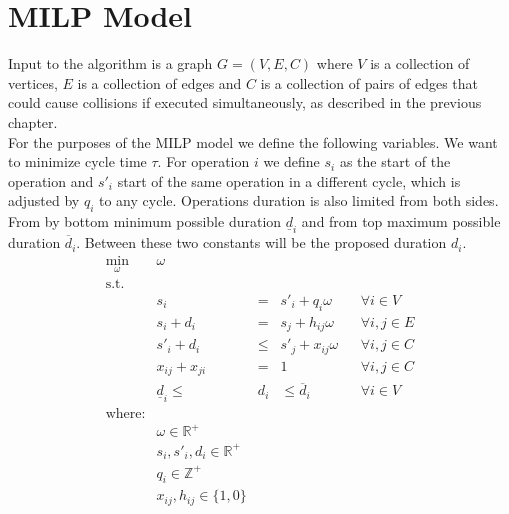 \chapter{MILP Model}
\label{ch:milp_model}
\graphicspath{{chapters/MILP_Model/}}

Input to the algorithm is a graph \(G=(V, E, C)\) where \(V\) is a collection of vertices, $E$ is a collection of edges and $C$ is a collection of pairs of edges that could cause collisions if executed simultaneously, as described in the previous chapter. \\

For the purposes of the MILP model we define the following variables. We want to minimize cycle time $\tau$. For operation $i$ we define $s_i$ as the start of the operation and $s'_i$ start of the same operation in a different cycle, which is adjusted by $q_i$ to any cycle. Operations duration is also limited from both sides. From by bottom minimum possible duration $\underline{d}_i$ and from top maximum possible duration $\overline{d}_i$. Between these two constants will be the proposed duration $d_i$. \\






\begin{equation}
\begin{matrix}
\displaystyle \min_\omega & \omega  \\
\textrm{s.t.} \\
& s_i & = & s'_i + q_i \omega & & \forall i \in V \\
& s_i + d_i & = & s_j + h_{ij} \omega & & \forall i, j \in E \\
& s'_i + d_i & \leq & s'_j + x_{ij} \omega & & \forall i, j \in C \\
& x_{ij} + x_{ji} & = & 1 & & \forall i, j \in C \\
& \underline{d}_i \leq &  d_i & \leq \overline{d}_i & & \forall i \in V \\

\textrm{where:} \\
& \omega \in \mathbb{R}^+\\
& s_i, s'_i, d_i \in \mathbb{R}^+\\
& q_i \in \mathbb{Z}^+\\
& x_{ij}, h_{ij} \in \{1, 0\} \\

\end{matrix}
\end{equation}

